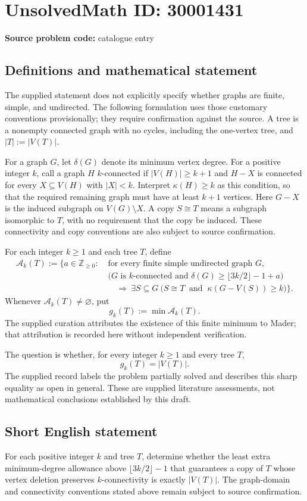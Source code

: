\documentclass[11pt]{article}
\newcommand{\Z}{\mathbb{Z}}
\begin{document}
\section*{UnsolvedMath ID: 30001431}
\textbf{Source problem code:} catalogue entry
\subsection{Definitions and mathematical statement}
The supplied statement does not explicitly specify whether graphs are finite, simple, and undirected. The following formulation uses those customary conventions provisionally; they require confirmation against the source. A tree is a nonempty connected graph with no cycles, including the one-vertex tree, and \(|T|:=|V(T)|\).

For a graph \(G\), let \(\delta(G)\) denote its minimum vertex degree. For a positive integer \(k\), call a graph \(H\) \(k\)-connected if \(|V(H)|\geq k+1\) and \(H-X\) is connected for every \(X\subseteq V(H)\) with \(|X|<k\). Interpret \(\kappa(H)\geq k\) as this condition, so that the required remaining graph must have at least \(k+1\) vertices. Here \(G-X\) is the induced subgraph on \(V(G)\setminus X\). A copy \(S\cong T\) means a subgraph isomorphic to \(T\), with no requirement that the copy be induced. These connectivity and copy conventions are also subject to source confirmation.

For each integer \(k\geq1\) and each tree \(T\), define
\[
\begin{aligned}
\mathcal A_k(T):=\bigl\{a\in\Z_{\geq0}:\;&\text{for every finite simple undirected graph }G,\\
&\bigl(G\text{ is }k\text{-connected and }
\delta(G)\geq\lfloor 3k/2\rfloor-1+a\bigr)\\
&\quad\Longrightarrow\ \exists S\subseteq G\ 
\bigl(S\cong T\ \text{ and }\ \kappa(G-V(S))\geq k\bigr)\bigr\}.
\end{aligned}
\]
Whenever \(\mathcal A_k(T)\neq\varnothing\), put
\[
g_k(T):=\min\mathcal A_k(T).
\]
The supplied curation attributes the existence of this finite minimum to Mader; that attribution is recorded here without independent verification.

The question is whether, for every integer \(k\geq1\) and every tree \(T\),
\[
g_k(T)=|V(T)|.
\]
The supplied record labels the problem partially solved and describes this sharp equality as open in general. These are supplied literature assessments, not mathematical conclusions established by this draft.
\subsection{Short English statement}
For each positive integer \(k\) and tree \(T\), determine whether the least extra minimum-degree allowance above \(\lfloor3k/2\rfloor-1\) that guarantees a copy of \(T\) whose vertex deletion preserves \(k\)-connectivity is exactly \(|V(T)|\). The graph-domain and connectivity conventions stated above remain subject to source confirmation.
\end{document}
